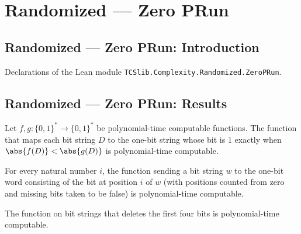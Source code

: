 \section{Randomized --- Zero PRun}
\subsection*{Randomized --- Zero PRun: Introduction}

Declarations of the Lean module \texttt{TCSlib.Complexity.Randomized.ZeroPRun}.

\subsection*{Randomized --- Zero PRun: Results}

\begin{theorem}
\label{Randomized.PIT.polyTimeComputable_ltLen}
\leanok
{}
Let $f,g : \{0,1\}^* \to \{0,1\}^*$ be polynomial-time computable functions. The
function that maps each bit string $D$ to the one-bit string whose bit is $1$ exactly
when $\abs{f(D)} < \abs{g(D)}$ is polynomial-time computable.
\end{theorem}

\begin{theorem}
\label{Randomized.PIT.polyTimeComputable_tagBit}
\leanok
{}
For every natural number $i$, the function sending a bit string $w$ to the one-bit word
consisting of the bit at position $i$ of $w$ (with positions counted from zero and
missing bits taken to be false) is polynomial-time computable.
\end{theorem}

\begin{theorem}
\label{Randomized.PIT.polyTimeComputable_bodyW}
\leanok
{}
The function on bit strings that deletes the first four bits is polynomial-time
computable.
\end{theorem}

